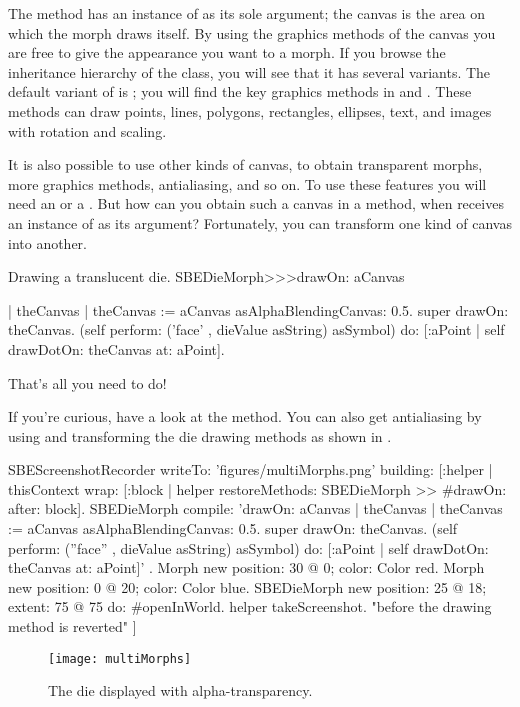 \documentclass[a4paper,10pt,twoside]{book}
\begin{document}
The  method has an instance of  as its sole argument; the canvas is the area on which the morph draws itself.
By using the graphics methods of the canvas you are free to give the appearance you want to a morph.
If you browse the inheritance hierarchy of the  class, you will see that it has several variants.
The default variant of  is ; you will find the key graphics methods in  and .
These methods can draw points, lines, polygons, rectangles, ellipses, text, and images with rotation and scaling.

It is also possible to use other kinds of canvas, to obtain transparent morphs, more graphics methods, antialiasing, and so on.
To use these features you will need an  or a .
But how can you obtain such a canvas in a  method, when  receives an instance of  as its argument?
Fortunately, you can transform one kind of canvas into another.

\begin{method}{Drawing a translucent die.}
SBEDieMorph>>>drawOn: aCanvas

	| theCanvas |
	theCanvas := aCanvas asAlphaBlendingCanvas: 0.5.
	super drawOn: theCanvas.
	(self perform: ('face' , dieValue asString) asSymbol) do: [:aPoint |
		self drawDotOn: theCanvas at: aPoint].
\end{method}
\noindent
That's all you need to do!

If you're curious, have a look at the  method.
You can also get antialiasing by using  and transforming the die drawing methods as shown in .

\begin{ExecuteSmalltalkScript}
SBEScreenshotRecorder writeTo: 'figures/multiMorphs.png' building: [:helper |
	thisContext wrap: [:block | helper restoreMethods: {SBEDieMorph >> #drawOn:} after: block].
	SBEDieMorph compile: 'drawOn: aCanvas
	| theCanvas |
	theCanvas := aCanvas asAlphaBlendingCanvas: 0.5.
	super drawOn: theCanvas.
	(self perform: (''face'' , dieValue asString) asSymbol)
		do: [:aPoint | self drawDotOn: theCanvas at: aPoint]'
	.
	{ Morph new
		position: 30 @ 0;
		color: Color red.
	Morph new
		position: 0 @ 20;
		color: Color blue.
	SBEDieMorph new
		position: 25 @ 18;
		extent: 75 @ 75 } do: #openInWorld.
	helper takeScreenshot. "before the drawing method is reverted"
]
\end{ExecuteSmalltalkScript}
\begin{figure}[ht]
	\centerline{\texttt{[image: multiMorphs]}}
	\caption{The die displayed with alpha-transparency.
		\label{fig:multiMorphs}}
\end{figure}
\end{document}
